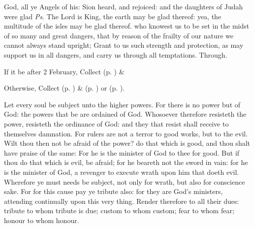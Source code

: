 \introit
{} God, all ye Angels of his: Sion heard, and rejoiced: and the daughters of Judah were glad \textit{Ps.} The Lord is King, the earth may be glad thereof: yea, the multitude of the isles may be glad thereof.
\collect
{} who knowest us to be set in the midst of so many and great dangers, that by reason of the frailty of our nature we cannot always stand upright; Grant to us such strength and protection, as may support us in all dangers, and carry us through all temptations. Through.
\begin{rubric}
    If it be after 2 February,  Collect  (p. \pageref{SPSaints}) \&  
\end{rubric}
\begin{rubric}
	Otherwise,  Collect  (p. \pageref{SPMaryPostChristmas}) \&   (p. \pageref{SPAgainst}) or  (p. \pageref{SPChiefBishop}).
\end{rubric}
 Let every soul be subject unto the higher powers. For there is no power but of God: the powers that be are ordained of God. Whosoever therefore resisteth the power, resisteth the ordinance of God: and they that resist shall receive to themselves damnation. For rulers are not a terror to good works, but to the evil. Wilt thou then not be afraid of the power? do that which is good, and thou shalt have praise of the same: For he is the minister of God to thee for good. But if thou do that which is evil, be afraid; for he beareth not the sword in vain: for he is the minister of God, a revenger to execute wrath upon him that doeth evil. Wherefore ye must needs be subject, not only for wrath, but also for conscience sake. For for this cause pay ye tribute also: for they are God's ministers, attending continually upon this very thing. Render therefore to all their dues: tribute to whom tribute is due; custom to whom custom; fear to whom fear; honour to whom honour.


